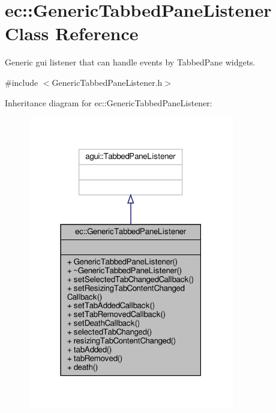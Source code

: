 \hypertarget{classec_1_1_generic_tabbed_pane_listener}{}\section{ec\+:\+:Generic\+Tabbed\+Pane\+Listener Class Reference}
\label{classec_1_1_generic_tabbed_pane_listener}


Generic gui listener that can handle events by Tabbed\+Pane widgets.  




{\ttfamily \#include $<$Generic\+Tabbed\+Pane\+Listener.\+h$>$}



Inheritance diagram for ec\+:\+:Generic\+Tabbed\+Pane\+Listener\+:\nopagebreak
\begin{figure}[H]
\begin{center}
\leavevmode
\includegraphics[width=255pt]{classec_1_1_generic_tabbed_pane_listener__inherit__graph}
\end{center}
\end{figure}


